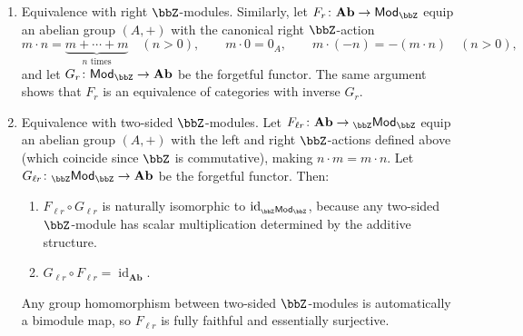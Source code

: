 \begin{proposition}
\begin{enumerate}
        \item Equivalence with right $\bbZ$-modules.
        Similarly, let $F_r \colon \mathbf{Ab} \to \mathsf{Mod}_\bbZ$ equip an abelian group $(A,+)$ with the canonical right $\bbZ$-action
        $$m \cdot n = \underbrace{m + \cdots + m}_{n \text{ times}} \quad (n > 0), \qquad m \cdot 0 = 0_A, \qquad m \cdot (-n) = -(m \cdot n) \quad (n > 0),$$
        and let $G_r \colon \mathsf{Mod}_\bbZ \to \mathbf{Ab}$ be the forgetful functor. The same argument shows that $F_r$ is an equivalence of categories with inverse $G_r$.

        \item Equivalence with two-sided $\bbZ$-modules.
        Let $F_{\ell r} \colon \mathbf{Ab} \to {}_\bbZ\mathsf{Mod}_\bbZ$ equip an abelian group $(A,+)$ with the left and right $\bbZ$-actions defined above (which coincide since $\bbZ$ is commutative), making $n \cdot m = m \cdot n$. Let $G_{\ell r} \colon {}_\bbZ\mathsf{Mod}_\bbZ \to \mathbf{Ab}$ be the forgetful functor. Then:
        \begin{enumerate}
            \item $F_{\ell r} \circ G_{\ell r}$ is naturally isomorphic to $\operatorname{id}_{{}_\bbZ\mathsf{Mod}_\bbZ}$, because any two-sided $\bbZ$-module has scalar multiplication determined by the additive structure.
            \item $G_{\ell r} \circ F_{\ell r} = \operatorname{id}_{\mathbf{Ab}}$.
        \end{enumerate}
        Any group homomorphism between two-sided $\bbZ$-modules is automatically a bimodule map, so $F_{\ell r}$ is fully faithful and essentially surjective.

    \end{enumerate}

\end{proposition}
